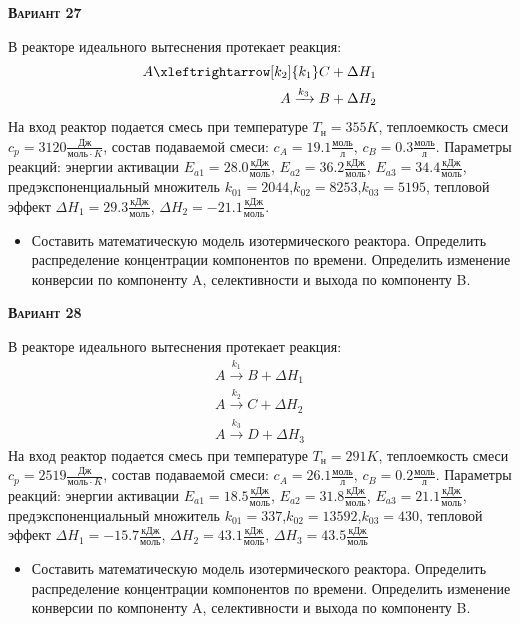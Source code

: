 \textsc{\textbf{Вариант 27}}

 В реакторе идеального вытеснения протекает реакция: \begin{equation*} \begin{aligned} A \xleftrightarrow[k_2]{k_1} C + \Delta H_1 \\ A \xrightarrow{k_3} B + \Delta H_2 \end{aligned} \end{equation*}                              На вход  реактор подается смесь при температуре $ T_{н} =  355 K$, теплоемкость смеси $c_p= 3120 \frac{Дж}{моль \cdot K}$, состав подаваемой смеси: $c_A=19.1 \frac{моль}{л}$, $c_B=0.3 \frac{моль}{л}$. Параметры реакций: энергии активации $E_{a1}=28.0 \frac{кДж}{моль}$, $E_{a2}=36.2  \frac{кДж}{моль}$, $E_{a3}=34.4  \frac{кДж}{моль}$, предэкспоненциальный множитель $k_{01}=      2044$,$k_{02}=      8253$,$k_{03}=      5195$, тепловой эффект $\Delta H_1= 29.3  \frac{кДж}{моль}$, $\Delta H_2=-21.1 \frac{кДж}{моль}$.\begin{itemize} \item Составить математическую модель изотермического реактора. Определить распределение концентрации компонентов по времени. Определить изменение конверсии по компоненту A, селективности и выхода по компоненту B. \end{itemize}

\textsc{\textbf{Вариант 28}}

 В реакторе идеального вытеснения протекает реакция: \begin{equation*} \begin{aligned} A \xrightarrow{k_1} B + \Delta H_1 \\ A \xrightarrow{k_2} C + \Delta H_2 \\ A \xrightarrow{k_3} D + \Delta H_3 \end{aligned} \end{equation*} На вход  реактор подается смесь при температуре $ T_{н} =  291 K$, теплоемкость смеси $c_p= 2519 \frac{Дж}{моль \cdot K}$, состав подаваемой смеси: $c_A=26.1 \frac{моль}{л}$, $c_B=0.2 \frac{моль}{л}$. Параметры реакций: энергии активации $E_{a1}=18.5 \frac{кДж}{моль}$, $E_{a2}=31.8  \frac{кДж}{моль}$, $E_{a3}=21.1  \frac{кДж}{моль}$, предэкспоненциальный множитель $k_{01}=       337$,$k_{02}=     13592$,$k_{03}=       430$, тепловой эффект $\Delta H_1= -15.7 \frac{кДж}{моль}$, $\Delta H_2=43.1 \frac{кДж}{моль}$, $\Delta H_3 = 43.5 \frac{кДж}{моль}$\begin{itemize} \item Составить математическую модель изотермического реактора. Определить распределение концентрации компонентов по времени. Определить изменение конверсии по компоненту A, селективности и выхода по компоненту B. \end{itemize}

